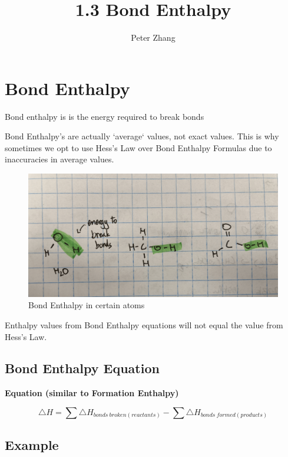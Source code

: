 \documentclass[12pt]{article} %
\title{1.3 Bond Enthalpy}
\author{Peter Zhang}
\begin{document}
\maketitle

\pagebreak

\tableofcontents

\pagebreak

\section {Bond Enthalpy}

Bond enthalpy is is the energy required to break bonds

Bond Enthalpy's are actually `average` values, not exact values. This is why sometimes we opt to use Hess's Law over Bond Enthalpy Formulas due to inaccuracies in average values.

\begin{figure}[h]
	\centering
	\includegraphics[width=\textwidth]{../images/1.3fig1.png}
	\caption{Bond Enthalpy in certain atoms}
	\label{fig:image}
\end{figure}

Enthalpy values from Bond Enthalpy equations will not equal the value from Hess's Law.

\subsection{Bond Enthalpy Equation}

\textbf{Equation (similar to Formation Enthalpy)}

$$\triangle{H} = \sum{\triangle{H}_{bonds\ broken(reactants)}} - \sum{\triangle{H}_{bonds\ formed(products)}}$$

\pagebreak

\subsection{Example}
\end{document}
